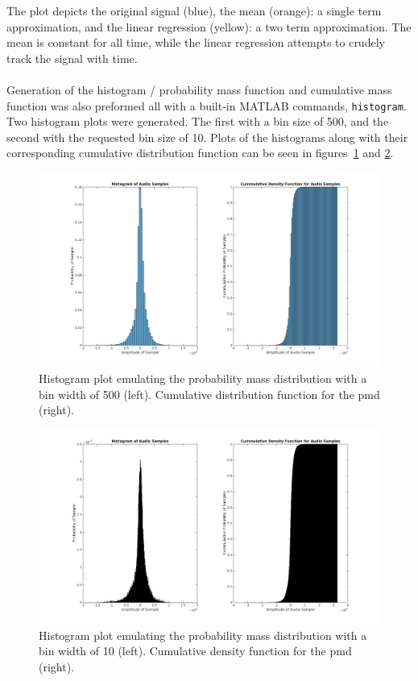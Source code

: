 \documentclass[paper=a4, fontsize=11pt]{scrartcl} %
\numberwithin{equation}{section} %
\numberwithin{figure}{section} %
\numberwithin{table}{section} %
\begin{document}
The plot depicts the original signal (blue),  the mean (orange): a single term approximation, and the linear regression (yellow): a two term approximation. The mean is constant for all time, while the linear regression attempts to crudely track the signal with time. \\

 \\
Generation of the histogram / probability mass function and cumulative mass function was also preformed all with a built-in MATLAB commands, \verb|histogram|. Two histogram plots were generated. The first with a bin size of 500, and the second with the requested bin size of 10. Plots of the histograms along with their corresponding cumulative distribution function can be seen in figures~\ref{fig: hist_500} and \ref{fig: histo_10}. 

\begin{figure}[H] %
	\centering 
	\includegraphics[width=\linewidth]{histo_01.png}
	\caption{Histogram plot emulating the probability mass distribution with a bin width of 500 (left). Cumulative distribution function for the pmd (right).}
	\label{fig: hist_500} 
\end{figure}

\begin{figure}[H] %
	\centering 
	\includegraphics[width=\linewidth]{histo_02.png}
	\caption{Histogram plot emulating the probability mass distribution with a bin width of 10 (left). Cumulative density function for the pmd (right). }
	\label{fig: histo_10} 
\end{figure}
\end{document}
